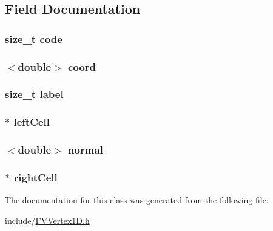 \subsection{Field Documentation}
\hypertarget{classFVVertex1D_acf258c3b3328a96e3ee1e3b875b7874f}{
\subsubsection[{code}]{\setlength{\rightskip}{0pt plus 5cm}size\_\-t {\bf code}}}
\label{d6/d5d/classFVVertex1D_acf258c3b3328a96e3ee1e3b875b7874f}
\hypertarget{classFVVertex1D_a24bb228b08fcf85e9bf69e16c270fe11}{
\subsubsection[{coord}]{$<$double$>$ {\bf coord}}}
\label{d6/d5d/classFVVertex1D_a24bb228b08fcf85e9bf69e16c270fe11}
\hypertarget{classFVVertex1D_a1ec973463c76e6d9e91160720959ad68}{
\subsubsection[{label}]{\setlength{\rightskip}{0pt plus 5cm}size\_\-t {\bf label}}}
\label{d6/d5d/classFVVertex1D_a1ec973463c76e6d9e91160720959ad68}
\hypertarget{classFVVertex1D_ae3725a6730dd0c3f3eedb3d13737820a}{
\subsubsection[{leftCell}]{$\ast$ {\bf leftCell}}}
\label{d6/d5d/classFVVertex1D_ae3725a6730dd0c3f3eedb3d13737820a}
\hypertarget{classFVVertex1D_ad6cbf5e80f090335e6723db414b554c0}{
\subsubsection[{normal}]{$<$double$>$ {\bf normal}}}
\label{d6/d5d/classFVVertex1D_ad6cbf5e80f090335e6723db414b554c0}
\hypertarget{classFVVertex1D_a5dac984cc6f3bc794792833147efc3b8}{
\subsubsection[{rightCell}]{ $\ast$ {\bf rightCell}}}
\label{d6/d5d/classFVVertex1D_a5dac984cc6f3bc794792833147efc3b8}


The documentation for this class was generated from the following file:\begin{DoxyCompactItemize}
\item 
include/\hyperlink{FVVertex1D_8h}{FVVertex1D.h}\end{DoxyCompactItemize}
